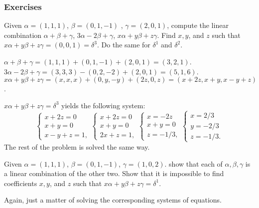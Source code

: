 \documentclass[../../main.tex]{subfiles}
\begin{document}
\subsubsection{Exercises}
\begin{problem} Given  $ \alpha = (1,1,1) $,  $ \beta = (0,1,-1) $  ,  $ \gamma = (2,0,1) $, compute the linear combination  $ \alpha + \beta + \gamma$, $3\alpha - 2\beta + \gamma$, $x\alpha + y\beta + z\gamma $. Find  $ x,y $, and  $ z $  such that  $ x\alpha + y\beta + z\gamma = (0,0,1) = \delta^3$. Do the same for  $ \delta^1 $  and  $ \delta^2 $.      
\end{problem}
\begin{solution}
	$\alpha + \beta + \gamma = (1,1,1) + (0, 1, -1) + (2,0,1) = (3, 2, 1)$. \\
	$3\alpha - 2\beta + \gamma = (3,3,3) - (0,2,-2) + (2,0,1) = (5, 1, 6)$. \\
	$x\alpha + y\beta + z\gamma = (x,x,x) + (0, y, -y) + (2z, 0, z) = (x+2z, x+y, x-y+z)$. \par
	$x\alpha + y \beta + z \gamma = \delta^3$ yields the following system:
	\[
	\begin{cases}
		x+2z = 0 \\
		x+y = 0 \\
		x-y+z = 1 , 
	\end{cases}
	\begin{cases} 
		x+2z = 0 \\
		x + y = 0 \\
		2x + z = 1,
	\end{cases}
	\begin{cases}
		x = -2z \\
		x + y = 0 \\
		z = -1/3,
	\end{cases}
	\begin{cases}
		x = 2/3 \\
		y = -2/3 \\
		z = - 1/3.
	\end{cases}

\]
The rest of the problem is solved the same way.
\end{solution}
\begin{problem}
	Given  $\alpha = (1,1,1)$,  $\beta = (0,1,-1)$,  $\gamma = (1,0,2)$. show that each of  $\alpha, \beta, \gamma$ is a linear combination of the other two. Show that it is impossible to find coefficients  $x, y$, and  $z$  such that  $x\alpha + y\beta +  z\gamma = \delta^1$.          	
\end{problem}
\begin{solution}
	Again, just a matter of solving the corresponding systems of equations.
\end{solution}
\end{document}

